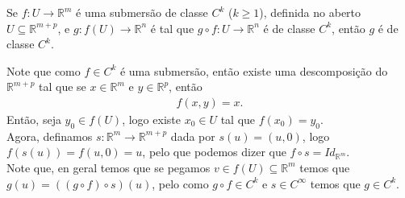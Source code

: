 \begin{homeworkProblem}[Seção 4-4]
  Se $f:U\to\mathbb{R}^{m}$ é uma submersão de classe $C^{k}$ ($k\geq 1$), definida no aberto $U\subseteq \mathbb{R}^{m+p}$, e $g:f(U)\to\mathbb{R}^{n}$ é tal que $g\circ f:U\to\mathbb{R}^{n}$ é de classe $C^{k}$, então $g$ é de classe $C^{k}$. 
  \begin{solution}
    Note que como $f\in C^{k}$ é uma submersão, então existe uma descomposição do $\mathbb{R}^{m+p}$ tal que se $x\in\mathbb{R}^{m}$ e $y\in\mathbb{R}^{p}$, então 
    \begin{align*}
      f(x,y)=x.
    \end{align*}
    Então, seja $y_0\in f(U)$, logo existe $x_0\in U$ tal que $f(x_0)=y_0$.\\
    Agora, definamos $s:\mathbb{R}^{m}\to\mathbb{R}^{m+p}$ dada por $s(u)=(u,0)$, logo $f(s(u))=f(u,0)=u$, pelo que podemos dizer que $f\circ s=Id_{\mathbb{R}^{m}}$.\\
    Note que, en geral temos que se pegamos $v\in f(U)\subseteq \mathbb{R}^{m}$ temos que $g(u)=((g\circ f)\circ s)(u)$, pelo como $g\circ f\in C^{k}$ e $s\in C^{\infty}$ temos que $g\in C^{k}$. 
  \end{solution}
\end{homeworkProblem}

